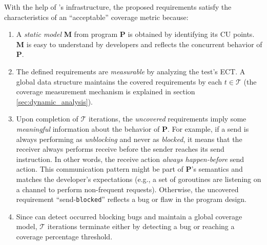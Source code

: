 %
With the help of \goat's infrastructure, the proposed requirements satisfy the characteristics of an ``acceptable'' coverage metric because:
\begin{enumerate}
  \item A \textit{static model} \textbf{M} from program \textbf{P} is obtained by identifying its CU points. \textbf{M} is easy to understand by developers and reflects the concurrent behavior of \textbf{P}.
  \item The defined requirements are \textit{measurable} by analyzing the test's ECT. A global data structure maintains the covered requirements by each $t \in \mathcal{T}$ (the coverage measurement mechanism is explained in section \ref{sec:dynamic_analysis}).
  \item Upon completion of $\mathcal{T}$ iterations, the \textit{uncovered} requirements imply some \textit{meaningful} information about the behavior of \textbf{P}. For example, if a send is always performing as \textit{unblocking} and never as \textit{blocked}, it means that the receiver always performs receive before the sender reaches its send instruction. In other words, the receive action \textit{always happen-before} send action. This communication pattern might be part of \textbf{P}'s semantics and matches the developer's expectations (e.g., a set of goroutines are listening on a channel to perform non-frequent requests). Otherwise, the uncovered requirement  ``send-\texttt{blocked}'' reflects a bug or flaw in the program design.
  \item Since \goat can detect occurred blocking bugs and maintain a global coverage model, $\mathcal{T}$ iterations terminate either by detecting a bug or reaching a coverage percentage threshold.
\end{enumerate}

%


